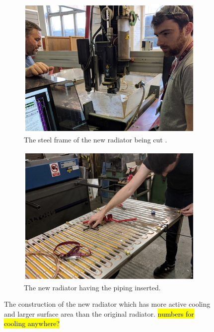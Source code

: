 \begin{figure}[htbp]
\centering
\begin{subfigure}{.5\textwidth}
  \centering
  \includegraphics[width=\linewidth]{Chapter3/Figs/Raster/detCon011b_RadiatorConstruction.png}
  \captionsetup{width=.9\linewidth}
  \caption{The steel frame of the new radiator being cut .}
  \label{subFig:detCon011b_RadiatorConstruction}
\end{subfigure}%
\begin{subfigure}{.5\textwidth}
  \centering
  \includegraphics[width=\linewidth]{Chapter3/Figs/Raster/detCon012b_RadiatorPiping.png}
  \captionsetup{width=.9\linewidth}
  \caption{The new radiator having the piping inserted.}
  \label{subFig:detCon012b_RadiatorPiping}
\end{subfigure}
\caption{The construction of the new radiator which has more active cooling and larger surface area than the original radiator. \hl{numbers for cooling anywhere?}}
\label{fig:detCon_RadiatorConstruction_RadiatorPiping}
\end{figure}

